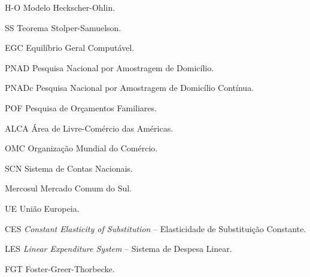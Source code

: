 

\listoffigures*
\cleardoublepage



\listofquadros*
\cleardoublepage



\listoftables*
\cleardoublepage



\begin{siglas}
	
	\item[H-O]      Modelo Heckscher-Ohlin.
	
	\item[SS]       Teorema Stolper-Samuelson.
	
	\item[EGC]      Equilíbrio Geral Computável.
	
	\item[PNAD]     Pesquisa Nacional por Amostragem de Domicílio.
	
	\item[PNADc]    Pesquisa Nacional por Amostragem de Domicílio Contínua.
	
	\item[POF]      Pesquisa de Orçamentos Familiares.
	
	\item[ALCA]     Área de Livre-Comércio das Américas.
	
	\item[OMC]      Organização Mundial do Comércio.
	
	\item[SCN]      Sistema de Contas Nacionais.
	
	\item[Mercosul] Mercado Comum do Sul.
	
	\item[UE]       União Europeia.
	
	\item[CES]      \textit{Constant Elasticity of Substitution} -- Elasticidade de Substituição Constante.
	
	\item[LES]      \textit{Linear Expenditure System} -- Sistema de Despesa Linear.
	
	\item[FGT]      Foster-Greer-Thorbecke.
\end{siglas}


